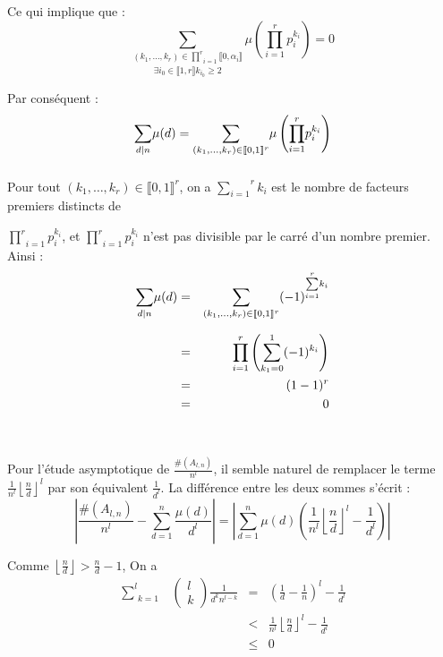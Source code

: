 Ce qui implique que :
\[ \underset{\exists i_0 \in \llbracket 1, r \rrbracket k_{i_0} \geqslant
   2}{\underset{(k_1, \ldots, k_r) \in \underset{i = 1}{\overset{r}{\prod}}
   \llbracket 0, \alpha_i \rrbracket}{\overset{}{\sum}}} \mu \left(
   \underset{i = 1}{\overset{r}{\prod}} p^{k_i}_i \right) = 0 \]


Par cons{\'e}quent :
\[ \underset{d |  n}{\sum} \mu (d) = \underset{}{\underset{(k_1,
   \ldots, k_r) \in \llbracket 0, 1 \rrbracket^r}{\overset{}{\sum}}} \mu
   \left( \underset{i = 1}{\overset{r}{\prod}} p^{k_i}_i \right) \]


Pour tout $(k_1, \ldots, k_r) \in \llbracket 0, 1 \rrbracket^r$, on a
$\overset{r}{\underset{i = 1}{\sum}} k_i$ est le nombre de facteurs premiers
distincts de

$\underset{i = 1}{\overset{r}{\prod}} p^{k_i}_i$, et $\underset{i =
1}{\overset{r}{\prod}} p^{k_i}_i$ n'est pas divisible par le carr{\'e} d'un
nombre premier. Ainsi :
\begin{eqnarray*}
  \underset{d |  n}{\sum} \mu (d) & = & \underset{}{\underset{(k_1,
  \ldots, k_r) \in \llbracket 0, 1 \rrbracket^r}{\overset{}{\sum}}} (-
  1)^{\overset{r}{\underset{i = 1}{\sum}} k_i}\\
  & = & \underset{i = 1}{\overset{r}{\prod}} \left( \underset{k_1 =
  0}{\overset{1 }{\sum}} (- 1)^{k_i} \right)\\
  & = & (1 - 1)^r\\
  & = & 0
\end{eqnarray*}


\

Pour l'{\'e}tude asymptotique de $\frac{\# (A_{l, n})}{n^l}$, il semble
naturel de remplacer le terme $\frac{1}{n^l} \left\lfloor \frac{n}{d}
\right\rfloor^l$ par son {\'e}quivalent $\frac{1}{d^l}$. La diff{\'e}rence
entre les deux sommes s'{\'e}crit :
\[ \left| \frac{\# (A_{l, n})}{n^l} - \underset{d = 1}{\overset{n}{\sum}}
   \frac{\mu (d)}{d^l} \right| = \left| \underset{d = 1}{\overset{n}{\sum}}
   \mu (d) \left( \frac{1}{n^l} \left\lfloor \frac{n}{d} \right\rfloor^l -
   \frac{1}{d^l} \right) \right| \]


Comme $\left\lfloor \frac{n}{d} \right\rfloor  > \frac{n}{d} - 1$, On a
\begin{eqnarray*}
  \underset{k = 1}{\overset{l}{\sum}} \begin{array}{c}
    \\
    
  \end{array} \left( \begin{array}{c}
    l\\
    k
  \end{array} \right) \frac{1}{d^k n^{l - k}} & = & \left( \frac{1}{d} -
  \frac{1}{n} \right)^l - \frac{1}{d^l}\\
  & < & \frac{1}{n^l} \left\lfloor \frac{n}{d} \right\rfloor^l -
  \frac{1}{d^l}\\
  & \leqslant & 0
\end{eqnarray*}


